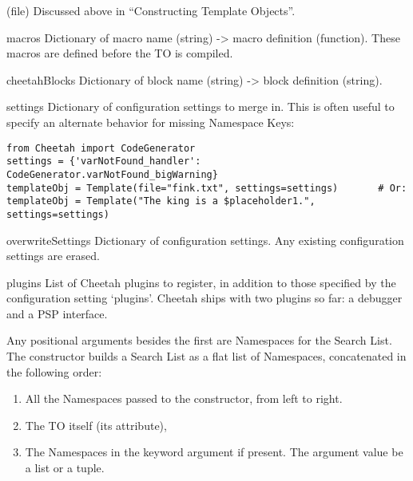 \begin{description}

\item(file) Discussed above in ``Constructing Template Objects''.

\item{macros} Dictionary of macro name (string) -> macro definition (function).
     These macros are defined before the TO is compiled.

\item{cheetahBlocks} Dictionary of block name (string) -> block definition
     (string).


\item{settings}  Dictionary of configuration settings to merge in.  This is
     often useful to specify an alternate behavior for missing Namespace Keys:
\begin{verbatim}
from Cheetah import CodeGenerator
settings = {'varNotFound_handler': CodeGenerator.varNotFound_bigWarning}
templateObj = Template(file="fink.txt", settings=settings)       # Or:
templateObj = Template("The king is a $placeholder1.", settings=settings)
\end{verbatim}
    

\item{overwriteSettings}  Dictionary of configuration settings.  Any existing
     configuration settings are erased.

\item{plugins}  List of Cheetah plugins to register, in addition to those
     specified by the configuration setting `plugins'.  Cheetah ships with two
     plugins so far: a debugger and a PSP interface.

\end{description}

     
Any positional arguments besides the first are Namespaces for the Search List.
The constructor builds a Search List as a flat list of Namespaces,
concatenated in the following order:

\begin{enumerate}

\item  All the Namespaces passed to the constructor, from left to right.

\item  The TO itself (its  attribute), 

\item  The Namespaces in the keyword argument  if present.  
     The argument value be a list or a tuple.

\end{enumerate}

